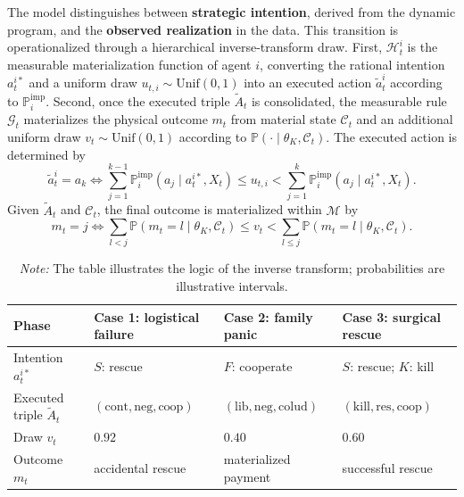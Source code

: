 \documentclass[12pt,a4paper]{article}
\theoremstyle{plain}
\theoremstyle{definition}
\theoremstyle{remark}
\newcommand{\ProbE}{\mathbb{P}}
\newcommand{\ProbI}[1]{\mathbb{P}_{#1}^{\mathrm{imp}}}
\newcommand{\1}{\mathbf{1}}
\newcommand{\Unif}{\mathrm{Unif}}
\begin{document}
The model distinguishes between \textbf{strategic intention}, derived from the dynamic
program, and the \textbf{observed realization} in the data. This transition is
operationalized through a hierarchical inverse-transform draw. First,
$\mathcal H_t^i$ is the measurable materialization function of agent $i$, converting
the rational intention $a_t^{i\ast}$ and a uniform draw $u_{t,i}\sim\Unif(0,1)$ into an
executed action $\tilde a_t^i$ according to $\ProbI{i}$. Second, once the executed
triple $\tilde A_t$ is consolidated, the measurable rule $\mathcal G_t$ materializes
the physical outcome $m_t$ from material state $\mathcal C_t$ and an additional uniform
draw $v_t\sim\Unif(0,1)$ according to $\ProbE(\cdot\mid\theta_K,\mathcal C_t)$. The
executed action is determined by
\begin{equation}
\label{eq:sorteo-individual}
\tilde{a}_t^i = a_k \iff
\sum_{j=1}^{k-1}\ProbI{i}(a_j\mid a_t^{i\ast},X_t)
\le u_{t,i} <
\sum_{j=1}^{k}\ProbI{i}(a_j\mid a_t^{i\ast},X_t).
\end{equation}
Given $\tilde A_t$ and $\mathcal C_t$, the final outcome is materialized within
$\mathcal M$ by
\begin{equation}
\label{eq:sorteo-m}
m_t = j \iff
\sum_{l<j}\ProbE(m_t=l\mid\theta_K,\mathcal C_t)
\le v_t <
\sum_{l\le j}\ProbE(m_t=l\mid\theta_K,\mathcal C_t).
\end{equation}

\begin{table}[htbp]
\centering
\caption{Materialization through inverse-transform intervals}
\label{tab:ejemplos-intervalos}
\begin{tabularx}{\linewidth}{@{}lXXX@{}}
\toprule
\textbf{Phase} & \textbf{Case 1: logistical failure} &
\textbf{Case 2: family panic} & \textbf{Case 3: surgical rescue} \\
\midrule
Intention $a_t^{i\ast}$ & $S$: rescue & $F$: cooperate & $S$: rescue; $K$: kill \\
Executed triple $\tilde A_t$ & $(\mathrm{cont},\mathrm{neg},\mathrm{coop})$ &
$(\mathrm{lib},\mathrm{neg},\mathrm{colud})$ &
$(\mathrm{kill},\mathrm{res},\mathrm{coop})$ \\
Draw $v_t$ & $0.92$ & $0.40$ & $0.60$ \\
Outcome $m_t$ & accidental rescue & materialized payment & successful rescue \\
\bottomrule
\end{tabularx}
\caption*{\footnotesize\textit{Note:} The table illustrates the logic of the inverse
transform; probabilities are illustrative intervals.}
\end{table}
\end{document}
